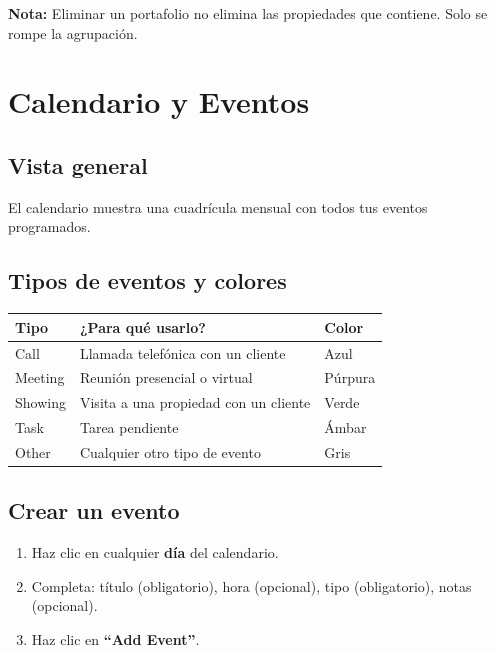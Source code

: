\documentclass[12pt,oneside]{article}
\begin{document}
\noindent\textbf{Nota:} Eliminar un portafolio no elimina las propiedades que contiene. Solo se rompe la agrupación.

\section{Calendario y Eventos}

\subsection{Vista general}

El calendario muestra una cuadrícula mensual con todos tus eventos programados.

\subsection{Tipos de eventos y colores}

\begin{tabularx}{\textwidth}{|X|X|X|}
\hline
\rowcolor{primary!10}
\textbf{Tipo} & \textbf{¿Para qué usarlo?} & \textbf{Color} \\
\hline
Call & Llamada telefónica con un cliente & Azul \\
\hline
Meeting & Reunión presencial o virtual & Púrpura \\
\hline
Showing & Visita a una propiedad con un cliente & Verde \\
\hline
Task & Tarea pendiente & Ámbar \\
\hline
Other & Cualquier otro tipo de evento & Gris \\
\hline
\end{tabularx}

\subsection{Crear un evento}

\begin{enumerate}[leftmargin=*]
  \item Haz clic en cualquier \textbf{día} del calendario.
  \item Completa: título (obligatorio), hora (opcional), tipo (obligatorio), notas (opcional).
  \item Haz clic en \textbf{“Add Event”}.
\end{enumerate}
\end{document}
